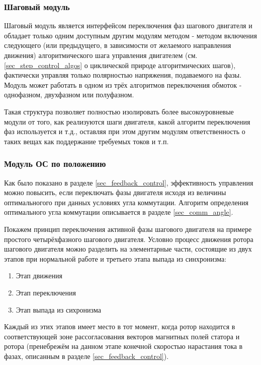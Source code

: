 \subsubsection{Шаговый модуль}

Шаговый модуль является интерфейсом переключения фаз шагового двигателя и
обладает только одним доступным другим модулям методом - методом включения
следующего (или предыдущего, в зависимости от желаемого направления движения)
алгоритмического шага управления двигателем (см. \ref{sec_step_control_algos}
о циклической природе алгоритмических шагов), фактически управляя только
полярностью напряжения, подаваемого на фазы. Модуль может работать в одном из трёх
алгоритмов переключения обмоток - однофазном, двухфазном или полуфазном.

Такая структура позволяет полностью изолировать более высокоуровневые модули от
того, как реализуются шаги двигателя, какой алгоритм переключения фаз
используется и т.д., оставляя при этом другим модулям ответственность о таких вещах
как поддержание требуемых токов и т.п.

\subsubsection{Модуль ОС по положению}

Как было показано в разделе \ref{sec_feedback_control}, эффективность управления
можно повысить, если переключать фазы двигателя исходя из величины оптимальногого
при данных условиях угла коммутации. Алгоритм определения оптимального угла
коммутации описывается в разделе \ref{sec_comm_angle}.

Покажем принцип переключения активной фазы шагового двигателя на примере простого
четырёхфазного шагового двигателя. Условно процесс движения ротора шагового двигателя
можно разделить на элементарные части, состоящие из двух этапов при нормальной
работе и третьего этапа выпада из синхронизма:

\begin{enumerate}
    \item Этап движения
    \item Этап переключения
    \item Этап выпада из сихронизма
\end{enumerate}

Каждый из этих этапов имеет место в тот момент, когда ротор находится в
соответствующей зоне рассогласования векторов магнитных полей статора и ротора
(пренебрежём на данном этапе конечной скоростью нарастания тока в фазах, описанным
в разделе \ref{sec_feedback_control}).

